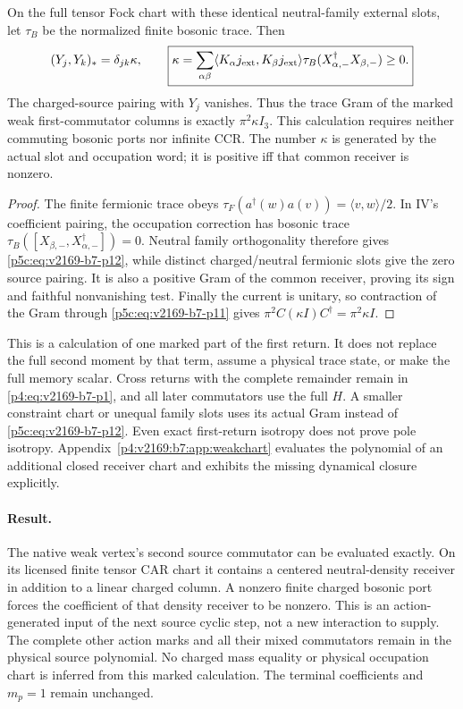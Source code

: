 \documentclass[12pt,a4paper]{article}
\begin{document}
\begin{proposition}
\label{p5c:v2169:b7:prop:weakgram}
On the full tensor Fock chart with these identical neutral-family external
slots, let $\tau_B$ be the normalized finite bosonic trace. Then
\begin{equation}
 (Y_j,Y_k)_*=\delta_{jk}\kappa,\qquad
 \boxed{\kappa=\sum_{\alpha\beta}
   \langle K_\alpha j_{\rm ext},K_\beta j_{\rm ext}\rangle
                 \tau_B(X_{\alpha,-}^\dagger X_{\beta,-})\geq0.}
 \label{p5c:eq:v2169-b7-p12}
\end{equation}
The charged-source pairing with $Y_j$ vanishes. Thus the trace Gram of the
marked weak first-commutator columns is exactly $\pi^2\kappa I_3$. This
calculation requires neither commuting bosonic ports nor infinite CCR.
The number $\kappa$ is generated by the actual slot and occupation word;
it is positive iff that common receiver is nonzero.
\end{proposition}
\begin{proof}
The finite fermionic trace obeys
$\tau_F(a^\dagger(w)a(v))=\langle v,w\rangle/2$. In IV's coefficient
pairing, the occupation correction has bosonic trace
$\tau_B([X_{\beta,-},X_{\alpha,-}^\dagger])=0$. Neutral family
orthogonality therefore gives \eqref{p5c:eq:v2169-b7-p12}, while distinct charged/neutral
fermionic slots give the zero source pairing. It is also a positive Gram
of the common receiver, proving its sign and faithful nonvanishing test.
Finally the current is unitary, so contraction of the Gram through \eqref{p5c:eq:v2169-b7-p11}
gives $\pi^2 C(\kappa I)C^\dagger=\pi^2\kappa I$.
\end{proof}

This is a calculation of one marked part of the first return. It does not
replace the full second moment by that term, assume a physical trace state,
or make the full memory scalar. Cross returns with the complete remainder
remain in \eqref{p4:eq:v2169-b7-p1}, and all later commutators use the full $H$. A smaller
constraint chart or unequal family slots uses its actual Gram instead of
\eqref{p5c:eq:v2169-b7-p12}. Even exact first-return isotropy does not prove pole isotropy.
Appendix~\ref{p4:v2169:b7:app:weakchart} evaluates the polynomial of an additional
closed receiver chart and exhibits the missing dynamical closure explicitly.

\paragraph{Result.}
The native weak vertex's second source commutator can be evaluated exactly.
On its licensed finite tensor CAR chart it contains a centered
neutral-density receiver in addition to a linear charged column. A nonzero
finite charged bosonic port forces the coefficient of that density receiver
to be nonzero. This is an action-generated input of the next source cyclic
step, not a new interaction to supply. The complete other action marks and
all their mixed commutators remain in the physical source polynomial.
No charged mass equality or physical occupation chart is inferred from this
marked calculation. The terminal coefficients and $m_p=1$ remain unchanged.
\end{document}
